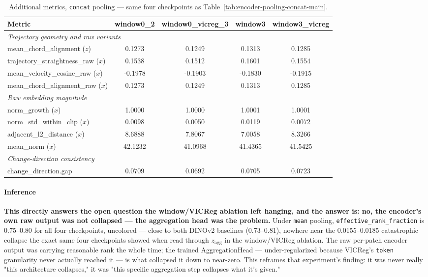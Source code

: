 \begin{table}[H]
\centering
\caption{Additional metrics, \texttt{concat} pooling --- same four checkpoints as
Table~\ref{tab:encoder-pooling-concat-main}.}
\label{tab:encoder-pooling-concat-additional}
\begin{tabular}{lcccc}
\toprule
Metric & window0\_2 & window0\_vicreg\_3 & window3 & window3\_vicreg \\
\midrule
\multicolumn{5}{l}{\textit{Trajectory geometry and raw variants}} \\
mean\_chord\_alignment ($z$) & 0.1273 & 0.1249 & 0.1313 & 0.1285 \\
trajectory\_straightness\_raw ($x$) & 0.1538 & 0.1512 & 0.1601 & 0.1554 \\
mean\_velocity\_cosine\_raw ($x$) & -0.1978 & -0.1903 & -0.1830 & -0.1915 \\
mean\_chord\_alignment\_raw ($x$) & 0.1273 & 0.1249 & 0.1313 & 0.1285 \\
\midrule
\multicolumn{5}{l}{\textit{Raw embedding magnitude}} \\
norm\_growth ($x$) & 1.0000 & 1.0000 & 1.0001 & 1.0001 \\
norm\_std\_within\_clip ($x$) & 0.0098 & 0.0050 & 0.0119 & 0.0072 \\
adjacent\_l2\_distance ($x$) & 8.6888 & 7.8067 & 7.0058 & 8.3266 \\
mean\_norm ($x$) & 42.1232 & 41.0968 & 41.4365 & 41.5425 \\
\midrule
\multicolumn{5}{l}{\textit{Change-direction consistency}} \\
change\_direction.gap & 0.0709 & 0.0692 & 0.0705 & 0.0723 \\
\bottomrule
\end{tabular}
\end{table}

\paragraph{Inference}

\textbf{This directly answers the open question the window/VICReg ablation left
hanging, and the answer is: no, the encoder's own raw output was not collapsed ---
the aggregation head was the problem.} Under \texttt{mean} pooling,
\texttt{effective\_rank\_fraction} is 0.75--0.80 for all four checkpoints, uncolored
--- close to both DINOv2 baselines (0.73--0.81), nowhere near the 0.0155--0.0185
catastrophic collapse the exact same four checkpoints showed when read through
$z_{\mathrm{agg}}$ in the window/VICReg ablation. The raw per-patch encoder output was
carrying reasonable rank the whole time; the trained AggregationHead --- under-regularized
because VICReg's \texttt{token} granularity never actually reached it --- is what
collapsed it down to near-zero. This reframes that experiment's finding: it was never
really "this architecture collapses," it was "this specific aggregation step collapses
what it's given."

